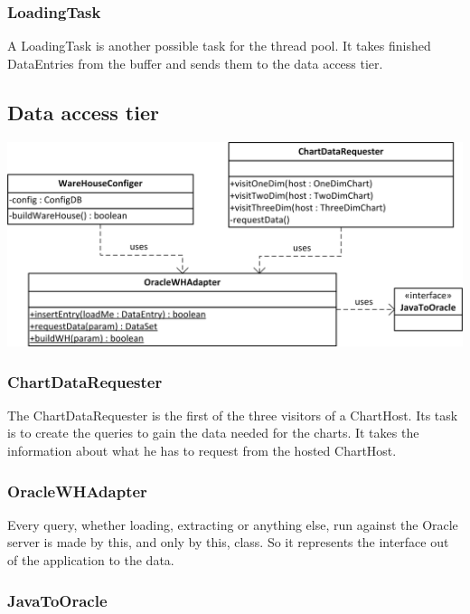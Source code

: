 \subsubsection*{LoadingTask}
A LoadingTask is another possible task for the thread pool.
It takes finished DataEntries from the buffer and sends them to the data access tier.




\subsection{Data access tier}

\begin{center}
\includegraphics{Pictures/Parts/Data.png}
\end{center} 

\subsubsection*{ChartDataRequester}

The ChartDataRequester is the first of the three visitors of a ChartHost. Its task is to 
create the queries to gain the data needed for the charts. It takes the information about what he
has to request from the hosted ChartHost.


\subsubsection*{OracleWHAdapter}

Every query, whether loading, extracting or anything else, run against the Oracle server is made by this,
and only by this, class. So it represents the interface out of the application to the data.



\subsubsection*{JavaToOracle}

